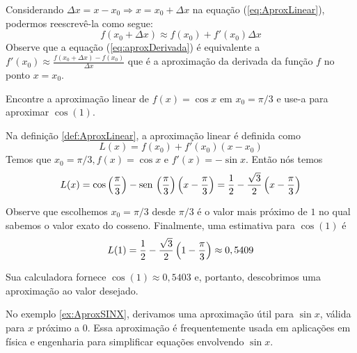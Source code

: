 \cleardoublepage\documentclass[../main.tex]{subfiles}
\begin{document}
Considerando   $\Delta x=x-x_0\Rightarrow x=x_0+\Delta x$ na equação (\ref{eq:AproxLinear}), podermos reescrevê-la como segue:
\begin{equation}
    f(x_0+\Delta x)\approx f(x_0)+f'(x_0)\Delta x\label{eq:aproxDerivada}
\end{equation}
Observe que a equação (\ref{eq:aproxDerivada}) é equivalente a $f'(x_0)\approx \frac{f(x_0+\Delta x)-f(x_0)}{\Delta x}$ que é  a aproximação da derivada da função $f$ no ponto $x=x_0$.
\begin{ex}
Encontre a aproximação linear de $f (x) = \cos x$ em $x_0 = \pi / 3$ e use-a para aproximar $\cos (1)$.
\end{ex}
\begin{sol}
Na definição \ref{def:AproxLinear}, a aproximação linear é definida como
$$L(x)=f(x_0)+f'(x_0)(x-x_0)$$
Temos que $x_0 = \pi / 3, f (x) = \cos x$ e $f'(x) = - \sin x$. Então nós temos 
$$L(x)=\cos\left(\frac{\pi}{3}\right)-\operatorname{sen}\,\left(\frac{\pi}{3}\right)\left(x-\frac{\pi}{3}\right)=\frac{1}{2}-\frac{\sqrt{3}}{2}\left(x-\frac{\pi}{3}\right)$$

Observe que escolhemos $x_0 = \pi/3$ desde $\pi/3$ é o valor mais próximo de $1$ no qual sabemos o valor exato do cosseno. Finalmente, uma estimativa para $\cos (1)$ é 
$$L(1)=\frac{1}{2}-\frac{\sqrt{3}}{2}\left(1-\frac{\pi}{3}\right)\approx 0,5409$$

Sua calculadora fornece $\cos (1) \approx 0,5403$ e, portanto, descobrimos uma aproximação ao valor desejado.
 
\end{sol}
No exemplo \ref{ex:AproxSINX}, derivamos uma aproximação útil para $\sin x$, válida para $x$ próximo a $0$. Essa  aproximação é frequentemente usada em aplicações em física e engenharia para simplificar equações envolvendo $\sin x$.
\end{document}
